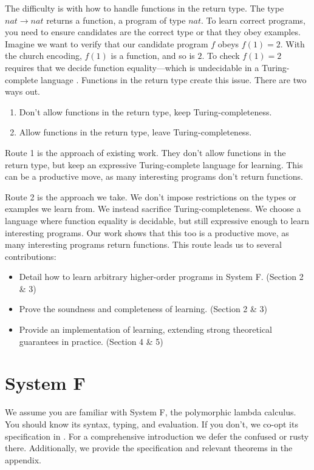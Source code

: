 \documentclass[acmsmall]{acmart}
\theoremstyle{mytheoremstyle}
\begin{document}
The difficulty is with how to handle functions in the return type. The type $nat \!\to\! nat$ returns a function, a program of type $nat$. To learn correct programs, you need to ensure candidates are the correct type or that they obey examples. Imagine we want to verify that our candidate program $f$ obeys $f(1)=2$. With the church encoding, $f(1)$ is a function, and so is $2$. To check $f(1)=2$ requires that we decide function equality---which is undecidable in a Turing-complete language \cite{sipser2006introduction}. Functions in the return type create this issue. There are two ways out.

\begin{enumerate}
\item Don't allow functions in the return type, keep Turing-completeness.
\item Allow functions in the return type, leave Turing-completeness.
\end{enumerate}

Route 1 is the approach of existing work. They don't allow functions in the return type, but keep an expressive Turing-complete language for learning. This can be a productive move, as many interesting programs don't return functions.

Route 2 is the approach we take. We don't impose restrictions on the types or examples we learn from. We instead sacrifice Turing-completeness. We choose a language where function equality is decidable, but still expressive enough to learn interesting programs. Our work shows that this too is a productive move, as many interesting programs return functions. This route leads us to several contributions:
\begin{itemize}
\item Detail how to learn arbitrary higher-order programs in System F. (Section 2 \& 3)
\item Prove the soundness and completeness of learning. (Section 2 \& 3)
\item Provide an implementation of learning, extending strong theoretical guarantees in practice. (Section 4 \& 5)
\end{itemize}


\section{System F}
We assume you are familiar with System F, the polymorphic lambda calculus. You should know its syntax, typing, and evaluation. If you don't, we co-opt its specification in \cite{pierce2002types}. For a comprehensive introduction we defer the confused or rusty there. Additionally, we provide the specification and relevant theorems in the appendix.
\end{document}
